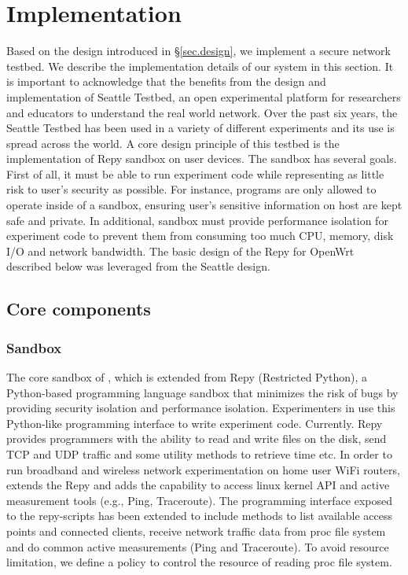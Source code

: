 \section{Implementation} 
\label{sec.implementation}

Based on the design introduced in \S{\ref{sec.design}}, we implement a 
secure network testbed. We describe the implementation details of our system 
in this section. It is important to acknowledge that the \sysname benefits from the design and implementation of Seattle Testbed, an open experimental platform for researchers and educators to understand the real world network. Over the past six years, the Seattle Testbed has been used in a variety of different experiments and its use is spread across the world. A core design principle of this testbed is the implementation of Repy sandbox on user devices. The sandbox has several goals. First of all, it must be able to run experiment code while representing as little risk to user's security as possible. For instance, programs are only allowed to operate inside of a sandbox, ensuring user's sensitive information on host are kept safe and private. In additional, sandbox must provide performance isolation for experiment code to prevent them from consuming too much CPU, memory, disk I/O and network bandwidth. The basic design of the Repy for OpenWrt described below was leveraged from the Seattle design.

\subsection{Core components}
\subsubsection{Sandbox}
\label{sec.sandbox}
The core sandbox of \sandboxname, which is extended from Repy (Restricted Python), a Python-based programming language sandbox that minimizes the risk of bugs by providing security isolation and performance isolation. Experimenters in \sysname use this Python-like programming interface to write experiment code. Currently. Repy provides programmers with the ability to read and write files on the disk, send TCP and UDP traffic and some utility methods to retrieve time etc. In order to run broadband and wireless network experimentation on home user WiFi routers, \sysname extends the Repy and adds the capability to access linux kernel API and active measurement tools (e.g., Ping, Traceroute). The programming interface exposed to the repy-scripts has been extended to include methods to list available access points and connected clients, receive network traffic data from proc file system and do common active measurements (Ping and Traceroute). To avoid resource limitation, we define a policy to control the resource of reading proc file system. 

